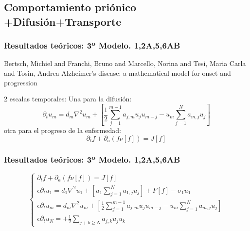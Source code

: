 \documentclass{beamer}
\begin{document}
\subsection{Comportamiento priónico +Difusión+Transporte}
\begin{frame}
	\frametitle{Resultados teóricos: 3º Modelo. 1,2A,5,6AB}
	\begin{block}{Bertsch, Michiel and Franchi, Bruno and Marcello, Norina and Tesi, Maria Carla and Tosin, Andrea}
		Alzheimer's disease: a mathematical model for onset and progression
	\end{block}
	2 escalas temporales: Una para la difusión:
	$$\partial_tu_m=d_m\nabla^2u_m+[\frac{1}{2}\sum_{j=1}^{m-1}a_{j,m}u_ju_{m-j}-u_m\sum_{j=1}^{N}a_{m,j}u_j]$$
	 otra para el progreso de la enfermedad:
	 $$\partial_tf+\partial_a(f\nu[f])=J[f]$$
\end{frame}

\begin{frame}
	\frametitle{Resultados teóricos: 3º Modelo. 1,2A,5,6AB}
	\begin{equation}
	\left\lbrace
	\begin{array}{ll}
	\partial_tf+\partial_a(f\nu[f])=J[f] \\
\epsilon\partial_tu_1=d_1\nabla^2u_1+[u_1\sum_{j=1}^{N}a_{1,j}u_j]+F[f]-\sigma_1u_1\\
	\epsilon\partial_tu_m=d_m\nabla^2u_m+[\frac{1}{2}\sum_{j=1}^{m-1}a_{j,m}u_ju_{m-j}-u_m\sum_{j=1}^{N}a_{m,j}u_j]  \\
	\epsilon\partial_tu_N=+\frac{1}{2}\sum_{j+k\geq N}a_{j,k}u_ju_k
	\end{array}
	\right.
	\end{equation}
	
\end{frame}
\end{document}
